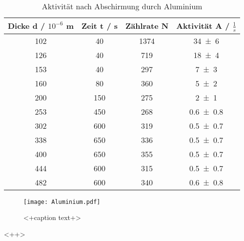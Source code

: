 \begin{table}
  \centering
  \begin{tabular}{c c c c}
    \toprule
    Dicke d / $10^{-6}$ m & Zeit t / s & Zählrate N & Aktivität A / $\frac{1}{s}$ \\
    \midrule
    102&	40 &	1374&	\num{34 +-6 } \\	
    126&	40 &	719&	\num{18 +-4 } \\	
    153&	40 &	297&	\num{7 +-3 } \\	
    160&	80 &	360&	\num{5 +-2 } \\	
    200&	150&	275&	\num{2 +-1 } \\	
    253&	450&	268&	\num{0.6 +-0.8 } \\	
    302&	600&	319&	\num{0.5 +-0.7 } \\	
    338&	650&	336&	\num{0.5 +-0.7 } \\	
    400&	650&	355&	\num{0.5 +-0.7 } \\	
    444&	600&	315&	\num{0.5 +-0.7 } \\	
    482&	600&	340&	\num{0.6 +-0.8 } \\	
    \bottomrule
  \end{tabular}
  \caption{Aktivität nach Abschirmung durch Aluminium}
  \label{tab:AAlu}
\end{table}

\begin{figure}
  \centering
  \texttt{[image: Aluminium.pdf]}
  \caption{<+caption text+>}
  \label{fig:<+label+>}
\end{figure}<++>
